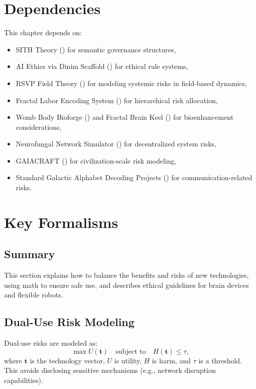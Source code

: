 \documentclass[11pt,oneside]{memoir}
\theoremstyle{plain}
\begin{document}
\section{Dependencies}
This chapter depends on:
\begin{itemize}
    \item SITH Theory () for semantic governance structures,
    \item AI Ethics via Dinim Scaffold () for ethical rule systems,
    \item RSVP Field Theory () for modeling systemic risks in field-based dynamics,
    \item Fractal Labor Encoding System () for hierarchical risk allocation,
    \item Womb Body Bioforge () and Fractal Brain Keel () for bioenhancement considerations,
    \item Neurofungal Network Simulator () for decentralized system risks,
    \item GAIACRAFT () for civilization-scale risk modeling,
    \item Standard Galactic Alphabet Decoding Projects () for communication-related risks.
\end{itemize}

\section{Key Formalisms}
\subsection{Summary}
This section explains how to balance the benefits and risks of new technologies, using math to ensure safe use, and describes ethical guidelines for brain devices and flexible robots.

\subsection{Dual-Use Risk Modeling}
Dual-use risks are modeled as:
\begin{equation}
    \max U(\mathbf{t}) \quad \text{subject to} \quad H(\mathbf{t}) \leq \tau,
    \label{eq:dual_use}
\end{equation}
where \(\mathbf{t}\) is the technology vector, \(U\) is utility, \(H\) is harm, and \(\tau\) is a threshold. This avoids disclosing sensitive mechanisms (e.g., network disruption capabilities).
\end{document}
